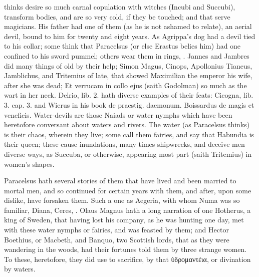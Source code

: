 {{thinks desire so much carnal copulation with witches (Incubi and
Succubi), transform bodies, and are so very cold, if they be touched;
and that serve magicians. His father had one of them (as he is not
ashamed to relate), an aerial devil, bound to him for twenty and
eight years. As Agrippa's dog had a devil tied to his collar; some
think that Paracelsus (or else Erastus belies him) had one confined to
his sword pummel; others wear them in rings, \etc{}. Jannes and Jambres did
many things of old by their help; Simon Magus, Cinops, Apollonius
Tianeus, Jamblichus, and Tritemius of late, that showed Maximilian the
emperor his wife, after she was dead; Et verrucam in collo ejus (saith
Godolman) so much as the wart in her neck. Delrio, lib. 2. hath
diverse examples of their feats: Cicogna, lib. 3. cap. 3. and Wierus in
his book \textlatin{de praestig. daemonum. Boissardus de magis et veneficis}.
Water-devils are those Naiads or water nymphs which have been
heretofore conversant about waters and rivers. The water (as Paracelsus
thinks) is their chaos, wherein they live; some call them fairies, and
say that Habundia is their queen; these cause inundations, many times
shipwrecks, and deceive men diverse ways, as Succuba, or otherwise,
appearing most part (saith Tritemius) in women's shapes.

Paracelsus hath several stories of them that have lived and been
married to mortal men, and so continued for certain years with them,
and after, upon some dislike, have forsaken them. Such a one as
Aegeria, with whom Numa was so familiar, Diana, Ceres, \etc{}. Olaus
Magnus hath a long narration of one Hotherus, a king of Sweden, that
having lost his company, as he was hunting one day, met with these
water nymphs or fairies, and was feasted by them; and Hector Boethius,
or Macbeth, and Banquo, two Scottish lords, that as they were wandering
in the woods, had their fortunes told them by three strange women. To
these, heretofore, they did use to sacrifice, by that ὑδρομαντέια, or
divination by waters.

}}
